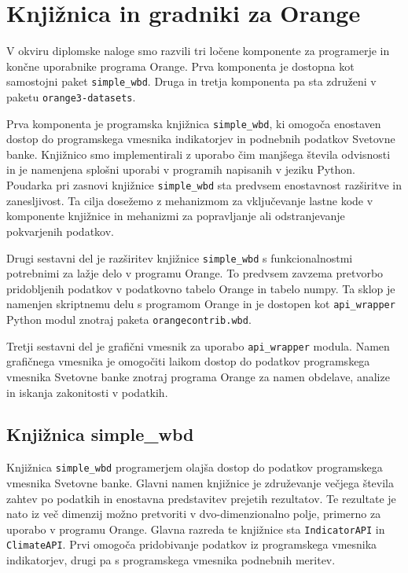 
\chapter{Knjižnica in gradniki za Orange}

V okviru diplomske naloge smo razvili tri ločene komponente za programerje in
končne uporabnike programa Orange. Prva komponenta je
dostopna kot samostojni paket 
\verb|simple_wbd|. 
Druga in tretja komponenta pa sta združeni v paketu
\verb|orange3-datasets|.

Prva komponenta je programska knjižnica \verb|simple_wbd|, ki
omogoča enostaven dostop do programskega vmesnika indikatorjev in podnebnih
podatkov Svetovne banke. Knjižnico smo implementirali z uporabo čim manjšega
števila odvisnosti in je 
namenjena splošni uporabi v programih napisanih v jeziku Python. Poudarka pri zasnovi knjižnice 
\verb|simple_wbd| sta predvsem enostavnost razširitve in zanesljivost. Ta cilja
dosežemo z mehanizmom za vključevanje lastne kode v komponente knjižnice
in mehanizmi za popravljanje ali odstranjevanje pokvarjenih podatkov.

Drugi sestavni del je razširitev knjižnice \verb|simple_wbd| s 
funkcionalnostmi potrebnimi za lažje delo v programu Orange. To predvsem 
zavzema pretvorbo pridobljenih podatkov v podatkovno tabelo Orange in tabelo 
numpy. Ta sklop je namenjen skriptnemu delu s programom Orange 
\cite{orange_scripting} in je dostopen
kot \verb|api_wrapper| Python modul znotraj paketa \verb|orangecontrib.wbd|.

Tretji sestavni del je grafični vmesnik za uporabo \verb|api_wrapper| modula.
Namen grafičnega vmesnika je omogočiti laikom dostop do podatkov 
programskega vmesnika Svetovne banke znotraj programa Orange za namen obdelave,
analize in iskanja zakonitosti v podatkih.

\section{Knjižnica simple\_wbd}

Knjižnica \verb|simple_wbd| programerjem olajša dostop do podatkov 
programskega vmesnika Svetovne banke. Glavni namen knjižnice je 
združevanje večjega števila zahtev po podatkih in enostavna predstavitev 
prejetih rezultatov. Te rezultate je nato iz več dimenzij možno pretvoriti v 
dvo-dimenzionalno polje, primerno za uporabo v programu Orange. Glavna 
razreda te knjižnice sta \verb|IndicatorAPI| in \verb|ClimateAPI|. Prvi 
omogoča pridobivanje podatkov iz programskega vmesnika indikatorjev, drugi pa 
s programskega vmesnika podnebnih meritev.


